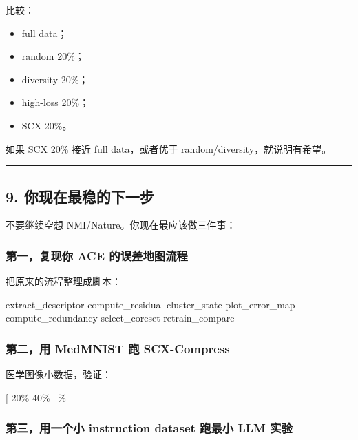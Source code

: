 \documentclass[
  12pt,
]{ctexart}
\newenvironment{Shaded}{}{}
\newcommand{\NormalTok}[1]{#1}
\providecommand{\tightlist}{%
  \setlength{\itemsep}{0pt}\setlength{\parskip}{0pt}}
\begin{document}
比较：

\begin{itemize}
\tightlist
\item
  full data；
\item
  random 20\%；
\item
  diversity 20\%；
\item
  high-loss 20\%；
\item
  SCX 20\%。
\end{itemize}

如果 SCX 20\% 接近 full data，或者优于 random/diversity，就说明有希望。

\begin{center}\rule{0.5\linewidth}{0.5pt}\end{center}

\subsection{9.
你现在最稳的下一步}\label{ux4f60ux73b0ux5728ux6700ux7a33ux7684ux4e0bux4e00ux6b65}

不要继续空想 NMI/Nature。你现在最应该做三件事：

\subsubsection{第一，复现你 ACE
的误差地图流程}\label{ux7b2cux4e00ux590dux73b0ux4f60-ace-ux7684ux8befux5deeux5730ux56feux6d41ux7a0b}

把原来的流程整理成脚本：

\begin{Shaded}
\begin{Highlighting}[]
\NormalTok{extract\_descriptor}
\NormalTok{compute\_residual}
\NormalTok{cluster\_state}
\NormalTok{plot\_error\_map}
\NormalTok{compute\_redundancy}
\NormalTok{select\_coreset}
\NormalTok{retrain\_compare}
\end{Highlighting}
\end{Shaded}

\subsubsection{第二，用 MedMNIST 跑
SCX-Compress}\label{ux7b2cux4e8cux7528-medmnist-ux8dd1-scx-compress}

医学图像小数据，验证：

{[} 20\%-40\%~ \%~\text{full data}{]}

\subsubsection{第三，用一个小 instruction dataset 跑最小 LLM
实验}\label{ux7b2cux4e09ux7528ux4e00ux4e2aux5c0f-instruction-dataset-ux8dd1ux6700ux5c0f-llm-ux5b9eux9a8c}
\end{document}

